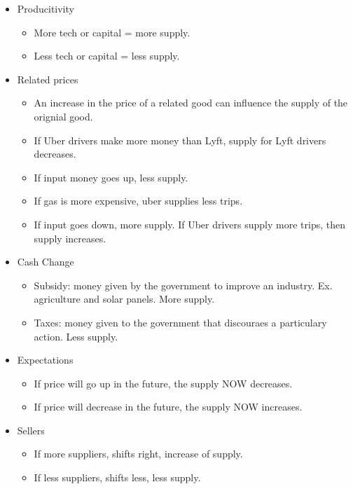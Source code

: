 \documentclass{scrreprt} %
\begin{document}
\begin{itemize}
	\item Producitivity
	\begin{itemize}
		\item More tech or capital = more supply.
		\item Less tech or capital = less supply.
	\end{itemize}
	\item Related prices
	\begin{itemize}
		\item An increase in the price of a related good can influence the 
		supply of the orignial good.
		\item If Uber drivers make more money than Lyft, supply for Lyft drivers
		decreases.
		\item If input money goes up, less supply.
		\item If gas is more expensive, uber supplies less trips.
		\item If input goes down, more supply. If Uber drivers supply more trips,
		then supply increases.
	\end{itemize}
	\item Cash Change
	\begin{itemize}
		\item Subsidy: money given by the government to improve an industry. Ex.
		agriculture and solar panels. More supply.
		\item Taxes: money given to the government that discouraes a particulary action.
		Less supply.
	\end{itemize}

	\item Expectations
	\begin{itemize}
		\item If price will go up in the future, the supply NOW decreases.
		\item If price will decrease in the future, the supply NOW increases.
	\end{itemize}
	\item Sellers
	\begin{itemize}
		\item If more suppliers, shifts right, increase of supply.
		\item If less suppliers, shifts less, less supply.	
	\end{itemize}

\end{itemize}
\end{document}
